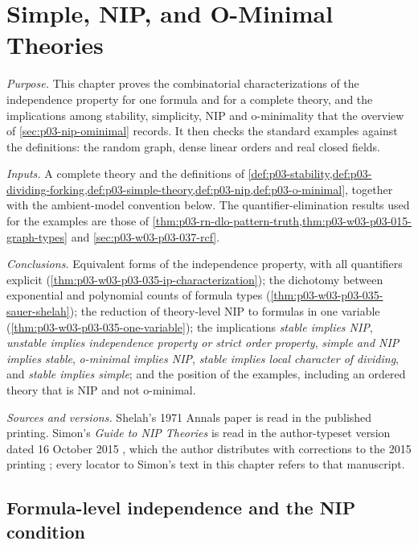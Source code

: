 \chapter{Simple, NIP, and O-Minimal Theories}
\label{sec:p03-w03-p03-035-chapter}

\emph{Purpose.}  This chapter proves the combinatorial characterizations of
the independence property for one formula and for a complete theory, and the
implications among stability, simplicity, NIP and o-minimality that the
overview of \cref{sec:p03-nip-ominimal} records.  It then checks the standard
examples against the definitions: the random graph, dense linear orders and
real closed fields.

\emph{Inputs.}  A complete theory and the definitions of
\cref{def:p03-stability,def:p03-dividing-forking,def:p03-simple-theory,def:p03-nip,def:p03-o-minimal},
together with the ambient-model convention below.  The quantifier-elimination
results used for the examples are those of
\cref{thm:p03-rn-dlo-pattern-truth,thm:p03-w03-p03-015-graph-types} and
\cref{sec:p03-w03-p03-037-rcf}.

\emph{Conclusions.}  Equivalent forms of the independence property, with all
quantifiers explicit (\cref{thm:p03-w03-p03-035-ip-characterization}); the
dichotomy between exponential and polynomial counts of formula types
(\cref{thm:p03-w03-p03-035-sauer-shelah}); the reduction of theory-level NIP to
formulas in one variable (\cref{thm:p03-w03-p03-035-one-variable}); the
implications \emph{stable implies NIP}, \emph{unstable implies independence
property or strict order property}, \emph{simple and NIP implies stable},
\emph{o-minimal implies NIP}, \emph{stable implies local character of
dividing}, and \emph{stable implies simple}; and the position of the
examples, including an ordered theory that is NIP and not o-minimal.

\emph{Sources and versions.}  Shelah's 1971 Annals paper
\cite{Shelah1971Stability} is read in the published printing.  Simon's
\emph{Guide to NIP Theories} is read in the author-typeset version dated
16 October 2015 \cite{Simon2015GuideManuscript}, which the author distributes
with corrections to the 2015 printing \cite{Simon2015}; every locator to
Simon's text in this chapter refers to that manuscript.

\section{Formula-level independence and the NIP condition}
\label{sec:p03-w03-p03-035-nip}

